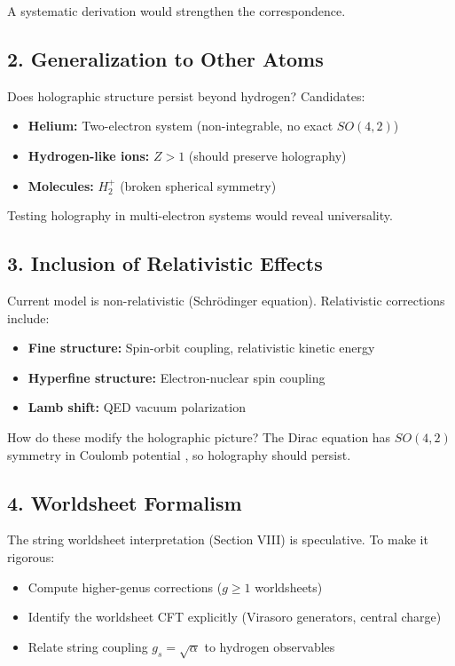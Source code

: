 \documentclass[aps,prd,twocolumn,superscriptaddress,floatfix]{revtex4-2}
\begin{document}
A systematic derivation would strengthen the correspondence.

\subsection{2. Generalization to Other Atoms}

Does holographic structure persist beyond hydrogen? Candidates:
\begin{itemize}
\item \textbf{Helium:} Two-electron system (non-integrable, no exact $SO(4,2)$)
\item \textbf{Hydrogen-like ions:} $Z>1$ (should preserve holography)
\item \textbf{Molecules:} $H_2^+$ (broken spherical symmetry)
\end{itemize}

Testing holography in multi-electron systems would reveal universality.

\subsection{3. Inclusion of Relativistic Effects}

Current model is non-relativistic (Schrödinger equation). Relativistic corrections include:
\begin{itemize}
\item \textbf{Fine structure:} Spin-orbit coupling, relativistic kinetic energy
\item \textbf{Hyperfine structure:} Electron-nuclear spin coupling
\item \textbf{Lamb shift:} QED vacuum polarization
\end{itemize}

How do these modify the holographic picture? The Dirac equation has $SO(4,2)$ symmetry in Coulomb potential \cite{dirac1963}, so holography should persist.

\subsection{4. Worldsheet Formalism}

The string worldsheet interpretation (Section VIII) is speculative. To make it rigorous:
\begin{itemize}
\item Compute higher-genus corrections ($g \geq 1$ worldsheets)
\item Identify the worldsheet CFT explicitly (Virasoro generators, central charge)
\item Relate string coupling $g_s = \sqrt{\alpha}$ to hydrogen observables
\end{itemize}
\end{document}
